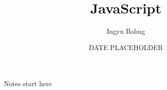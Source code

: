 \documentclass[10pt]{article}
\title{JavaScript}
\date{DATE PLACEHOLDER}
\author{Ingyu Bahng}
\begin{document}


Notes start here
  
\end{document}
